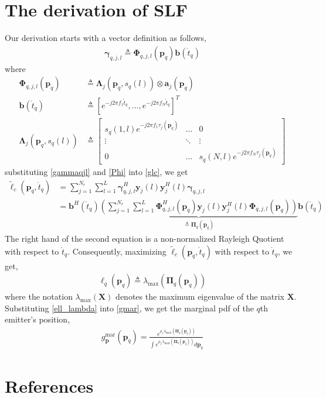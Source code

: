 \documentclass[review]{elsarticle}
\begin{document}
\appendix
\section{The derivation of SLF}\label{ApA}
Our derivation starts with a vector definition as follows,
\begin{align}\label{gammaqjl}
    \boldsymbol{\gamma}_{q,j,l}\triangleq\boldsymbol{\Phi}_{q,j,l}(\boldsymbol{p}_q)\boldsymbol{b}(\mathring{t}_q)
\end{align}
where
\begin{align}\label{Phi}
    \boldsymbol{\Phi}_{q,j,l}(\boldsymbol{p}_q)&\triangleq\boldsymbol{\Lambda}_j(\boldsymbol{p}_q,s_q(l))\otimes \boldsymbol{a}_j(\boldsymbol{p}_q)\\
    \boldsymbol{b}(\mathring{t}_q)&\triangleq[e^{-j2\pi f_1\mathring{t}_q},...,e^{-j2\pi f_N\mathring{t}_q}]^T\\
    \boldsymbol{\Lambda}_j(\boldsymbol{p}_q,s_q(l))&\triangleq 
    \left[ 
    \begin{array}{ccc}
        s_q(1,l)e^{-j2\pi f_1\tau_j(\boldsymbol{p}_q)}& \ldots & 0\\
        \vdots&\ddots&\vdots\\
        0&\ldots&s_q(N,l)e^{-j2\pi f_N\tau_j(\boldsymbol{p}_q)}
    \end{array}
    \right ]   
\end{align}
substituting \eqref{gammaqjl} and \eqref{Phi} into \eqref{glc}, we get
\begin{align}
    \tilde{\ell}_c(\boldsymbol{p}_q,\mathring{t}_q)&= \sum_{j=1}^{N_r} \sum_{l=1}^{L} \boldsymbol{\gamma}_{q,j,l}^H\boldsymbol{y}_j(l)\boldsymbol{y}_j^H(l)\boldsymbol{\gamma}_{q,j,l}\\
    &=\boldsymbol{b}^H(\mathring{t}_q)\underbrace{\left(\sum_{j=1}^{N_r} \sum_{l=1}^{L} \boldsymbol{\Phi}^H_{q,j,l}(\boldsymbol{p}_q)\boldsymbol{y}_j(l)\boldsymbol{y}_j^H(l)\boldsymbol{\Phi}_{q,j,l}(\boldsymbol{p}_q)\right)}_{\triangleq\boldsymbol{\Pi}_q(\boldsymbol{p}_q)} \boldsymbol{b}(\mathring{t}_q)
\end{align}
The right hand of the second equation is a non-normalized Rayleigh Quotient with respect to $\mathring{t}_q$. Consequently, maximizing $\tilde{\ell}_c(\boldsymbol{p}_q,\mathring{t}_q)$ with respect to $\mathring{t}_q$, we get,
\begin{align}\label{ell_lambda}
    \ell_q(\boldsymbol{p}_q)\triangleq\lambda_{\text{max}}(\boldsymbol{\Pi}_q(\boldsymbol{p}_q))
\end{align}
where the notation $\lambda_{\text{max}}(\boldsymbol{X})$ denotes the maximum eigenvalue of the matrix $\boldsymbol{X}$. Substituting \eqref{ell_lambda} into \eqref{gmar}, we get the marginal pdf of the $q$th emitter's position,
\begin{align}\label{gpq}
    g_{\boldsymbol{p}}^{\text{mar}}(\boldsymbol{p}_q)=\frac{e^{\rho_1\lambda_{\text{max}}(\boldsymbol{\Pi}_q(\boldsymbol{p}_q))}}{\int e^{\rho_1\lambda_{\text{max}}(\boldsymbol{\Pi}_q(\boldsymbol{p}_q))} d\boldsymbol{p}_q}
\end{align}

\section*{References}

\end{document}
